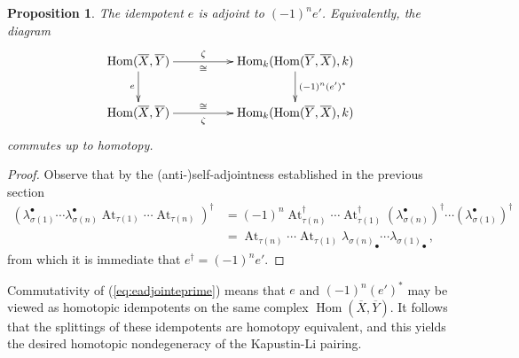 \documentclass{compositio}
\newtheorem{proposition}[theorem]{Proposition}
\theoremstyle{definition}
\numberwithin{equation}{section}
\def\Hom{\operatorname{Hom}}
\DeclareMathOperator{\At}{At}
\begin{document}
\begin{proposition}\label{prop:eadjointeprime} The idempotent $e$ is adjoint to $(-1)^n e'$. Equivalently, the diagram
\begin{equation}\label{eq:eadjointeprime}
\xymatrix@C+2pc{
\Hom(\overline{X}, \overline{Y}) \ar[d]_-{e} \ar[r]^-{\zeta}_-{\cong} & \Hom_k(\Hom(\overline{Y},\overline{X}),k) \ar[d]^-{(-1)^n (e')^*}\\
\Hom(\overline{X}, \overline{Y}) \ar[r]_-{\zeta}^-{\cong} & \Hom_k( \Hom(\overline{Y}, \overline{X}), k )
}
\end{equation}
commutes up to homotopy.
\end{proposition}
\begin{proof} 
Observe that by the (anti-)self-adjointness established in the previous section
\begin{align*}
\left( \lambda_{\sigma(1)}^\bullet \cdots \lambda_{\sigma(n)}^\bullet \At_{\tau(1)} \cdots \At_{\tau(n)} \right)^{\dagger} &= (-1)^n \At^\dagger_{\tau(n)} \cdots \At^\dagger_{\tau(1)} (\lambda_{\sigma(n)}^\bullet)^\dagger \cdots (\lambda_{\sigma(1)}^\bullet)^{\dagger}\\
&= \At_{\tau(n)} \cdots \At_{\tau(1)} {\lambda_{\sigma(n)}}_{\bullet} \cdots {\lambda_{\sigma(1)}}_{\bullet}\,,
\end{align*}
from which it is immediate that $e^{\dagger} = (-1)^n e'$.
\end{proof}

Commutativity of (\ref{eq:eadjointeprime}) means that $e$ and $(-1)^n (e')^*$ may be viewed as homotopic idempotents on the same complex $\Hom(\overline{X}, \overline{Y})$. It follows that the splittings of these idempotents are homotopy equivalent, and this yields the desired homotopic nondegeneracy of the Kapustin-Li pairing.
\end{document}
